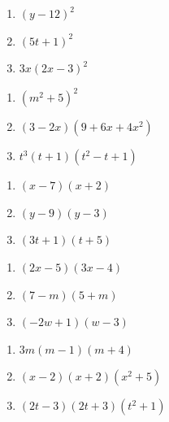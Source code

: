 \documentclass{ximera}
\begin{document}
\begin{multicols}{3}
\begin{enumerate}
\setcounter{enumi}{\value{HW}}

\item $(y-12)^2$
\item $(5t+1)^2$
\item $3x(2x-3)^2$

\setcounter{HW}{\value{enumi}}
\end{enumerate}
\end{multicols}

\begin{multicols}{3}
\begin{enumerate}
\setcounter{enumi}{\value{HW}}

\item $(m^2+5)^2$
\item $(3-2x)(9 + 6x + 4x^2)$
\item $t^3(t+1)(t^2 - t + 1)$


\setcounter{HW}{\value{enumi}}
\end{enumerate}
\end{multicols}



\begin{multicols}{3}
\begin{enumerate}
\setcounter{enumi}{\value{HW}}

\item $(x-7)(x+2)$
\item $(y-9)(y-3)$
\item $(3t+1)(t+5)$


\setcounter{HW}{\value{enumi}}
\end{enumerate}
\end{multicols}


\begin{multicols}{3}
\begin{enumerate}
\setcounter{enumi}{\value{HW}}

\item $(2x-5)(3x-4)$
\item $(7-m)(5+m)$
\item $(-2w+1)(w-3)$



\setcounter{HW}{\value{enumi}}
\end{enumerate}
\end{multicols}


\begin{multicols}{3}
\begin{enumerate}
\setcounter{enumi}{\value{HW}}

\item $3m(m-1)(m+4)$
\item $(x-2)(x+2)(x^2+5)$
\item $(2t-3)(2t+3)(t^2+1)$


\setcounter{HW}{\value{enumi}}
\end{enumerate}
\end{multicols}
\end{document}
